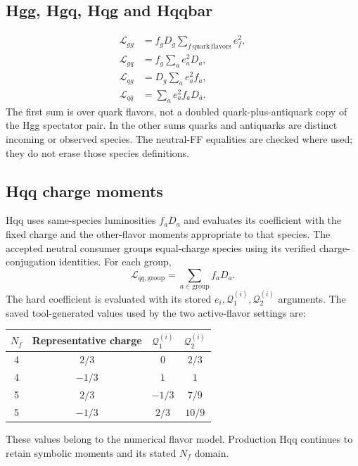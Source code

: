 \documentclass[11pt,a4paper]{article}
\begin{document}
\subsection{Hgg, Hgq, Hqg and Hqqbar}

\begin{align}
 \mathcal L_{gg}&=f_gD_g\sum_{f\,\mathrm{quark\ flavors}}e_f^2,\\
 \mathcal L_{gq}&=f_g\sum_a e_a^2D_a,\\
 \mathcal L_{qg}&=D_g\sum_a e_a^2f_a,\\
 \mathcal L_{q\bar q}&=\sum_a e_a^2f_aD_{\bar a}.
 \label{eq:simplelums}
\end{align}
The first sum is over quark flavors, not a doubled quark-plus-antiquark
copy of the Hgg spectator pair. In the other sums quarks and antiquarks
are distinct incoming or observed species. The neutral-FF equalities
are checked where used; they do not erase those species definitions.

\subsection{Hqq charge moments}

Hqq uses same-species luminosities $f_aD_a$ and evaluates its coefficient
with the fixed charge and the other-flavor moments appropriate to that
species. The accepted neutral consumer groups equal-charge species
using its verified charge-conjugation identities. For each group,
\begin{equation}
 \mathcal L_{qq,\mathrm{group}}=\sum_{a\in\mathrm{group}}f_aD_a.
\end{equation}
The hard coefficient is evaluated with its stored
$e_i,\mathcal Q_1^{(i)},\mathcal Q_2^{(i)}$ arguments. The saved
tool-generated values used by the two active-flavor settings are:
\begin{center}
\begin{tabular}{@{}cccc@{}}
\toprule
$N_f$ & Representative charge & $\mathcal Q_1^{(i)}$ & $\mathcal Q_2^{(i)}$\\
\midrule
4 & $2/3$ & $0$ & $2/3$\\
4 & $-1/3$ & $1$ & $1$\\
5 & $2/3$ & $-1/3$ & $7/9$\\
5 & $-1/3$ & $2/3$ & $10/9$\\
\bottomrule
\end{tabular}
\end{center}
These values belong to the numerical flavor model. Production Hqq
continues to retain symbolic moments and its stated $N_f$ domain.
\end{document}
